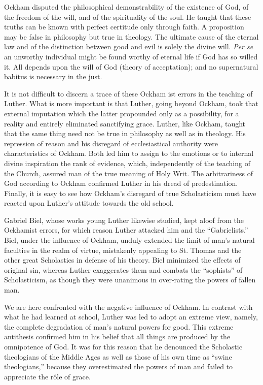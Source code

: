 Ockham disputed the philosophical demonstrability of the existence of
God, of the freedom of the will, and of the spirituality of the soul. He
taught that these truths can be known with perfect certitude only through
faith. A proposition may be false in philosophy but true in theology. The
ultimate cause of the eternal law and of the distinction between good and
evil is solely the divine will. \textit{Per se} an unworthy individual might be found
worthy of eternal life if God has so willed it. All depends upon the will
of God (theory of acceptation); and no supernatural babitus is necessary in
the just.

It is not difficult to discern a trace of these Ockham ist errors in the
teaching of Luther. What is more important is that Luther, going beyond
Ockham, took that external imputation which the latter propounded only
as a possibility, for a reality and entirely eliminated sanctifying grace.
Luther, like Ockham, taught that the same thing need not be true in
philosophy as well as in theology. His repression of reason and his disregard
of ecclesiastical authority were characteristics of Ockham. Both led him
to assign to the emotions or to internal divine inspiration the rank of
evidence, which, independently of the teaching of the Church, assured man of
the true meaning of Holy Writ. The arbitrariness of God according to Ockham
confirmed Luther in his dread of predestination. Finally, it is easy to see
how Ockham’s disregard of true Scholasticism must have reacted upon
Luther’s attitude towards the old school.

Gabriel Biel, whose works young Luther likewise studied, kept aloof
from the Ockhamist errors, for which reason Luther attacked him and the
“Gabrielists.” Biel, under the influence of Ockham, unduly extended the
limit of man’s natural faculties in the realm of virtue, mistakenly appealing
to St. Thomas and the other great Scholastics in defense of his theory. Biel
minimized the effects of original sin, whereas Luther exaggerates them and
combats the “sophists” of Scholasticism, as though they were unanimous
in over-rating the powers of fallen man.

We are here confronted with the negative influence of Ockham. In contrast
with what he had learned at school, Luther was led to adopt an extreme
view, namely, the complete degradation of man’s natural powers
for good. This extreme antithesis confirmed him in his belief that all
things are produced by the omnipotence of God. It was for this reason
that he denounced the Scholastic theologians of the Middle Ages as well
as those of his own time as “swine theologians,” because they overestimated
the powers of man and failed to appreciate the rôle of grace.

